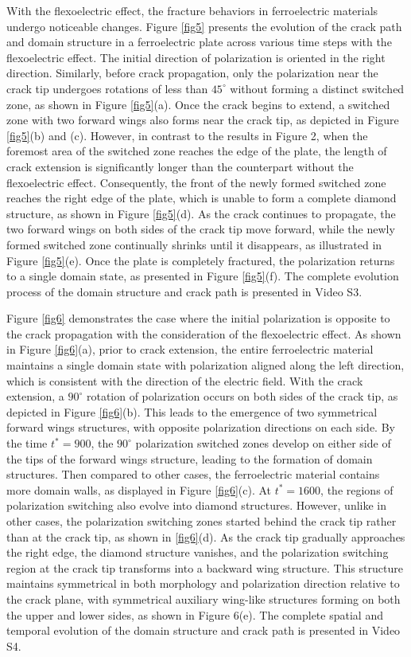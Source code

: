 \documentclass[final,times,fleqn,11pt]{elsarticle}
\begin{document}
With the flexoelectric effect, the fracture behaviors in ferroelectric materials undergo noticeable changes. Figure \ref{fig5} presents the evolution of the crack path and domain structure in a ferroelectric plate across various time steps with the flexoelectric effect. The initial direction of polarization is oriented in the right direction. Similarly, before crack propagation, only the polarization near the crack tip undergoes rotations of less than $45^\circ$ without forming a distinct switched zone, as shown in Figure \ref{fig5}(a). Once the crack begins to extend, a switched zone with two forward wings also forms near the crack tip, as depicted in Figure \ref{fig5}(b) and (c). However, in contrast to the results in Figure 2, when the foremost area of the switched zone reaches the edge of the plate, the length of crack extension is significantly longer than the counterpart without the flexoelectric effect. Consequently, the front of the newly formed switched zone reaches the right edge of the plate, which is unable to form a complete diamond structure, as shown in Figure \ref{fig5}(d). As the crack continues to propagate, the two forward wings on both sides of the crack tip move forward, while the newly formed switched zone continually shrinks until it disappears, as illustrated in Figure \ref{fig5}(e). Once the plate is completely fractured, the polarization returns to a single domain state, as presented in Figure \ref{fig5}(f). The complete evolution process of the domain structure and crack path is presented in Video S3.

Figure \ref{fig6} demonstrates the case where the initial polarization is opposite to the crack propagation with the consideration of the flexoelectric effect. As shown in Figure \ref{fig6}(a), prior to crack extension, the entire ferroelectric material maintains a single domain state with polarization aligned along the left direction, which is consistent with the direction of the electric field. With the crack extension, a $90^\circ$ rotation of polarization occurs on both sides of the crack tip, as depicted in Figure \ref{fig6}(b). This leads to the emergence of two symmetrical forward wings structures, with opposite polarization directions on each side. By the time $t^*=900$, the $90^\circ$ polarization switched zones develop on either side of the tips of the forward wings structure, leading to the formation of domain structures. Then compared to other cases, the ferroelectric material contains more domain walls, as displayed in Figure \ref{fig6}(c). At $t^*=1600$, the regions of polarization switching also evolve into diamond structures. However, unlike in other cases, the polarization switching zones started behind the crack tip rather than at the crack tip, as shown in \ref{fig6}(d). As the crack tip gradually approaches the right edge, the diamond structure vanishes, and the polarization switching region at the crack tip transforms into a backward wing structure. This structure maintains symmetrical in both morphology and polarization direction relative to the crack plane, with symmetrical auxiliary wing-like structures forming on both the upper and lower sides, as shown in Figure 6(e). The complete spatial and temporal evolution of the domain structure and crack path is presented in Video S4.
\end{document}
